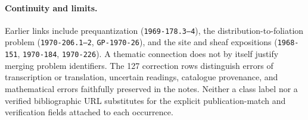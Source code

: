 \paragraph{Continuity and limits.}
Earlier links include prequantization (\texttt{1969-178.3--4}),
the distribution-to-foliation problem (\texttt{1970-206.1--2},
\texttt{GP-1970-26}), and the
site and sheaf expositions (\texttt{1968-151}, \texttt{1970-184},
\texttt{1970-226}).  A thematic connection does not by itself justify merging
problem identifiers.  The 127 correction rows distinguish errors
of transcription or translation, uncertain readings, catalogue provenance,
and mathematical errors faithfully preserved in the notes.  Neither a
class label nor a verified bibliographic URL substitutes for the explicit
publication-match and verification fields attached to each occurrence.
\clearpage
